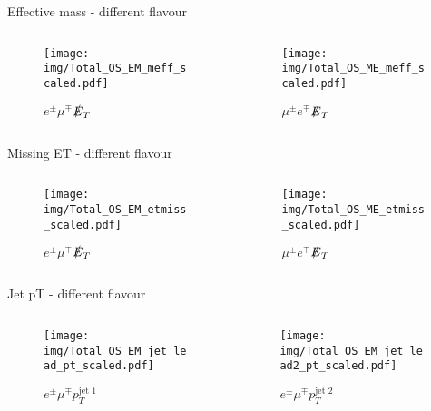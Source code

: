\documentclass{beamer}
\begin{document}
\begin{frame}{Effective mass - different flavour}
  \begin{columns}
    \begin{column}{0.45\textwidth}\begin{figure}
      \caption{$e^{\pm}\mu^{\mp}$$\slashed{E}_{T}$}
      \texttt{[image: img/Total\_OS\_EM\_meff\_scaled.pdf]}
    \end{figure}\end{column}
    \begin{column}{0.45\textwidth}\begin{figure}
      \caption{$\mu^{\pm}e^{\mp}$$\slashed{E}_{T}$}
      \texttt{[image: img/Total\_OS\_ME\_meff\_scaled.pdf]}
    \end{figure}\end{column}
  \end{columns}
\end{frame}

\begin{frame}{Missing ET - different flavour}
  \begin{columns}
    \begin{column}{0.45\textwidth}\begin{figure}
      \caption{$e^{\pm}\mu^{\mp}$$\slashed{E}_{T}$}
      \texttt{[image: img/Total\_OS\_EM\_etmiss\_scaled.pdf]}
    \end{figure}\end{column}
    \begin{column}{0.45\textwidth}\begin{figure}
      \caption{$\mu^{\pm}e^{\mp}$$\slashed{E}_{T}$}
      \texttt{[image: img/Total\_OS\_ME\_etmiss\_scaled.pdf]}
    \end{figure}\end{column}
  \end{columns}
\end{frame}

\begin{frame}{Jet pT - different flavour}
  \begin{columns}
    \begin{column}{0.45\textwidth}\begin{figure}
      \caption{$e^{\pm}\mu^{\mp}$$p_{T}^{\text{jet 1}}$}
      \texttt{[image: img/Total\_OS\_EM\_jet\_lead\_pt\_scaled.pdf]}
    \end{figure}\end{column}
    \begin{column}{0.45\textwidth}\begin{figure}
      \caption{$e^{\pm}\mu^{\mp}$$p_{T}^{\text{jet 2}}$}
      \texttt{[image: img/Total\_OS\_EM\_jet\_lead2\_pt\_scaled.pdf]}
    \end{figure}\end{column}
  \end{columns}
\end{frame}
\end{document}
